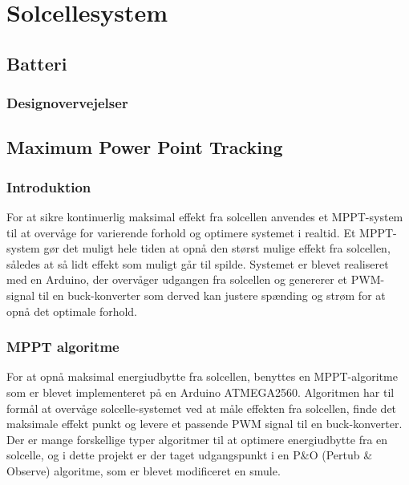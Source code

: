 \documentclass[../main.tex]{subfiles}
\begin{document}
\chapter{Solcellesystem} \label{Chap:Solcellesystem}

\section{Batteri}

    \subsection{Designovervejelser}

\section{Maximum Power Point Tracking}

    \subsection{Introduktion}

For at sikre kontinuerlig maksimal effekt fra solcellen anvendes et MPPT-system til at overvåge for varierende forhold og optimere systemet i realtid. Et MPPT-system gør det muligt hele tiden at opnå den størst mulige effekt fra solcellen, således at så lidt effekt som muligt går til spilde. Systemet er blevet realiseret med en Arduino, der overvåger udgangen fra solcellen og genererer et PWM-signal til en buck-konverter som derved kan justere spænding og strøm for at opnå det optimale forhold. 

    \subsection{MPPT algoritme}

    For at opnå maksimal energiudbytte fra solcellen, benyttes en MPPT-algoritme som er blevet implementeret på en Arduino ATMEGA2560. Algoritmen har til formål at overvåge solcelle-systemet ved at måle effekten fra solcellen, finde det maksimale effekt punkt og levere et passende PWM signal til en buck-konverter. Der er mange forskellige typer algoritmer til at optimere energiudbytte fra en solcelle, og i dette projekt er der taget udgangspunkt i en P\&O (Pertub \& Observe) algoritme, som er blevet modificeret en smule. 
    
\end{document}
